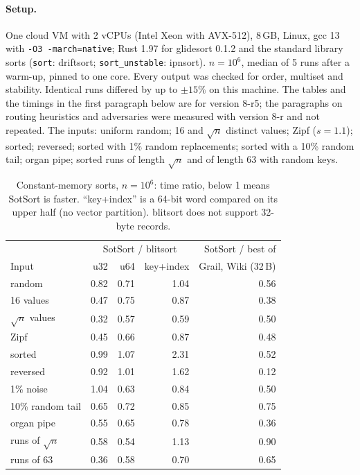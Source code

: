 \documentclass[10pt,a4paper]{article}
\begin{document}
\paragraph{Setup.} One cloud VM with 2 vCPUs (Intel Xeon with AVX-512), 8\,GB, Linux, gcc 13
with \texttt{-O3 -march=native}; Rust 1.97 for glidesort 0.1.2 and the standard library sorts
(\texttt{sort}: driftsort; \texttt{sort\_unstable}: ipnsort). $n=10^6$, median of 5 runs after a
warm-up, pinned to one core. Every output was checked for order, multiset and stability.
Identical runs differed by up to $\pm15\%$ on this machine. The tables and the timings in
the first paragraph below are for version 8-r5; the paragraphs on routing heuristics and
adversaries were measured with version 8-r and not repeated. The inputs: uniform random; 16 and
$\sqrt n$ distinct values; Zipf ($s=1.1$); sorted; reversed; sorted with 1\% random
replacements; sorted with a 10\% random tail; organ pipe; sorted runs of length $\sqrt n$ and
of length 63 with random keys.

\begin{table}[t]\centering\small
\begin{tabular}{lrrrr}
\toprule
 & \multicolumn{3}{c}{SotSort / blitsort} & SotSort / best of\\
Input & u32 & u64 & key+index & Grail, Wiki (32\,B)\\
\midrule
random & 0.82 & 0.71 & 1.04 & 0.56\\
16 values & 0.47 & 0.75 & 0.87 & 0.38\\
$\sqrt n$ values & 0.32 & 0.57 & 0.59 & 0.50\\
Zipf & 0.45 & 0.66 & 0.87 & 0.48\\
sorted & 0.99 & 1.07 & 2.31 & 0.52\\
reversed & 0.92 & 1.01 & 1.62 & 0.12\\
1\% noise & 1.04 & 0.63 & 0.84 & 0.50\\
10\% random tail & 0.65 & 0.72 & 0.85 & 0.75\\
organ pipe & 0.55 & 0.65 & 0.78 & 0.36\\
runs of $\sqrt n$ & 0.58 & 0.54 & 1.13 & 0.90\\
runs of 63 & 0.36 & 0.58 & 0.70 & 0.65\\
\bottomrule
\end{tabular}
\caption{Constant-memory sorts, $n=10^6$: time ratio, below 1 means SotSort is faster.
``key+index'' is a 64-bit word compared on its upper half (no vector partition). blitsort does
not support 32-byte records.}\label{tab:o1}
\end{table}
\end{document}
